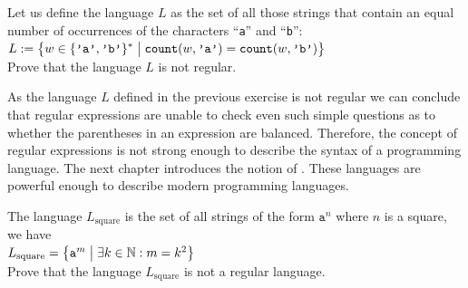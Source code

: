 \exerciseEng
Let us define the language $L$ as the set of all those strings that contain an equal number of 
occurrences of the characters ``\texttt{a}'' and  ``\texttt{b}'':
\\[0.2cm]
\hspace*{1.3cm}
$\displaystyle L := \bigl\{ w \in \{\texttt{'a'}, \texttt{'b'}\}^* \bigm| \texttt{count}(w, \texttt{'a'})=\texttt{count}(w, \texttt{'b'}) \bigr\}$
\\[0.2cm]
Prove that the language $L$ is not regular. \eox

\remarkEng
As the language $L$ defined in the previous exercise is not regular we can conclude that regular expressions
are unable to check even such simple questions as to whether the parentheses in an expression are balanced.
Therefore, the concept of regular expressions is not strong enough to describe the syntax of a programming language.
The next chapter introduces the notion of .  These languages
are powerful enough to describe modern programming languages. 

\exerciseEng
The language  $L_{\mathrm{square}}$ is the set of all strings of the form $\mathtt{a}^n$ where $n$
is a square, we have
\\[0.2cm]
\hspace*{1.3cm}
$L_{\mathrm{square}} = \bigl\{ \mathtt{a}^{m} \bigm| \exists k \in \mathbb{N}: m = k^2 \bigr\}$
\\[0.2cm]
Prove that the language  $L_{\mathrm{square}}$ is not a regular language.
\eox
\vspace*{0.1cm}

